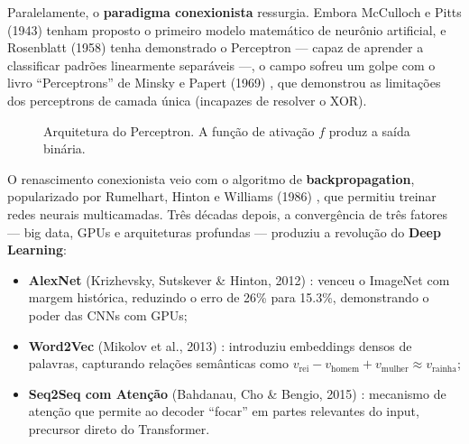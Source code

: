 Paralelamente, o \textbf{paradigma conexionista} ressurgia. Embora McCulloch e Pitts (1943) \cite{mcculloch1943logical} tenham proposto o primeiro modelo matemático de neurônio artificial, e Rosenblatt (1958) \cite{rosenblatt1958perceptron} tenha demonstrado o Perceptron --- capaz de aprender a classificar padrões linearmente separáveis ---, o campo sofreu um golpe com o livro ``Perceptrons'' de Minsky e Papert (1969) \cite{minsky1969perceptrons}, que demonstrou as limitações dos perceptrons de camada única (incapazes de resolver o XOR).

\begin{figure}[htbp]
\centering
{}
\caption{Arquitetura do Perceptron. A função de ativação $f$ produz a saída binária.}
\label{fig:perceptron}
\end{figure}

O renascimento conexionista veio com o algoritmo de \textbf{backpropagation}, popularizado por Rumelhart, Hinton e Williams (1986) \cite{rumelhart1986learning}, que permitiu treinar redes neurais multicamadas. Três décadas depois, a convergência de três fatores --- big data, GPUs e arquiteturas profundas --- produziu a revolução do \textbf{Deep Learning}:

\begin{itemize}
    \item \textbf{AlexNet} (Krizhevsky, Sutskever \& Hinton, 2012) \cite{krizhevsky2012imagenet}: venceu o ImageNet com margem histórica, reduzindo o erro de 26\% para 15.3\%, demonstrando o poder das CNNs com GPUs;
    \item \textbf{Word2Vec} (Mikolov et al., 2013) \cite{mikolov2013efficient}: introduziu embeddings densos de palavras, capturando relações semânticas como $v_{\text{rei}} - v_{\text{homem}} + v_{\text{mulher}} \approx v_{\text{rainha}}$;
    \item \textbf{Seq2Seq com Atenção} (Bahdanau, Cho \& Bengio, 2015) \cite{bahdanau2015neural}: mecanismo de atenção que permite ao decoder ``focar'' em partes relevantes do input, precursor direto do Transformer.
\end{itemize}

